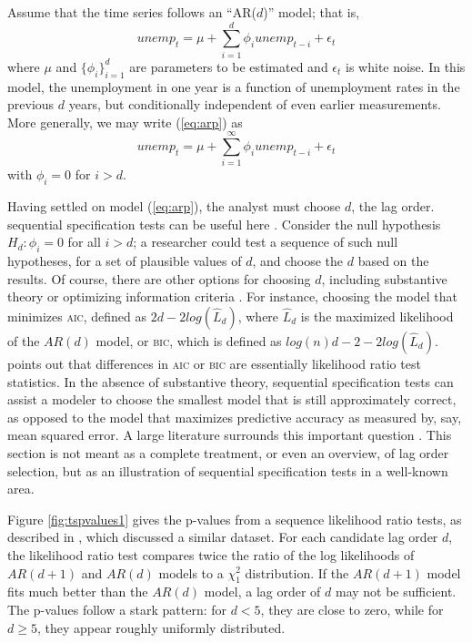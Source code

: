 \documentclass[lineno]{biometrika}\usepackage[]{graphicx}\usepackage[]{color}
\begin{document}
Assume that the time series follows an ``AR($d$)'' model; that is,
\begin{equation}\label{eq:arp}
unemp_t=\mu + \displaystyle\sum_{i=1}^d \phi_i unemp_{t-i}+\epsilon_t
\end{equation}
where $\mu$ and $\{\phi_i\}_{i=1}^d$ are parameters to be estimated
and $\epsilon_t$ is white noise.
In this model, the unemployment in one year is a function of
unemployment rates in the previous $d$ years, but conditionally
independent of even earlier measurements.
More generally, we may write (\ref{eq:arp}) as
\begin{equation*}
unemp_t=\mu+\displaystyle\sum_{i=1}^\infty \phi_i
unemp_{t-i}+\epsilon_t
\end{equation*}
with $\phi_i=0$ for $i>d$.

Having settled on model (\ref{eq:arp}), the analyst must choose $d$,
the lag order.
sequential specification tests can be useful here \citep[e.g.][]{practitionersGuide}.
Consider the null hypothesis $H_d: \phi_i=0$ for all $i>d$;
a researcher could test a sequence of such null hypotheses, for a set
of plausible values of $d$, and choose the $d$ based on the results.
Of course, there are other options for choosing $d$, including
substantive theory or optimizing
information criteria
\citep{akaike1969fitting,schwarz1978estimating}.
For instance, choosing the model that minimizes \textsc{aic}, defined as
$2d -2log(\hat{L}_d)$, where $\hat{L}_d$ is the maximized likelihood
of the $AR(d)$ model, or \textsc{bic}, which is defined as $log(n)d-2 -2log(\hat{L}_d)$.
\citealt{potscher1991effects} points out that differences in \textsc{aic} or
\textsc{bic} are essentially likelihood ratio test statistics.
In the absence of substantive theory, sequential specification tests can assist a modeler to
choose the smallest model that is still approximately correct, as
opposed to the model that maximizes predictive accuracy as measured
by, say, mean squared error.
A large literature surrounds this important question \citep[See,
e.g.][and the citations
therein]{mcquarrie1998regression,liew2004lag}. This section is not
meant as a complete treatment, or even an overview, of lag order
selection, but as an illustration of sequential specification tests in a well-known area.

Figure \ref{fig:tspvalues1} gives the p-values from a sequence
likelihood ratio tests, as described in \citet[][Ch.1]{urca}, which
discussed a similar dataset.
For each candidate lag order $d$, the likelihood ratio test compares
twice the ratio of the log likelihoods of $AR(d+1)$ and $AR(d)$ models
to a $\chi^2_1$ distribution.
If the $AR(d+1)$ model fits much better than the $AR(d)$ model, a lag
order of $d$ may not be sufficient.
The p-values follow a stark pattern: for $d<5$, they are close to
zero, while for $d\ge5$, they appear roughly uniformly distributed.
\end{document}
